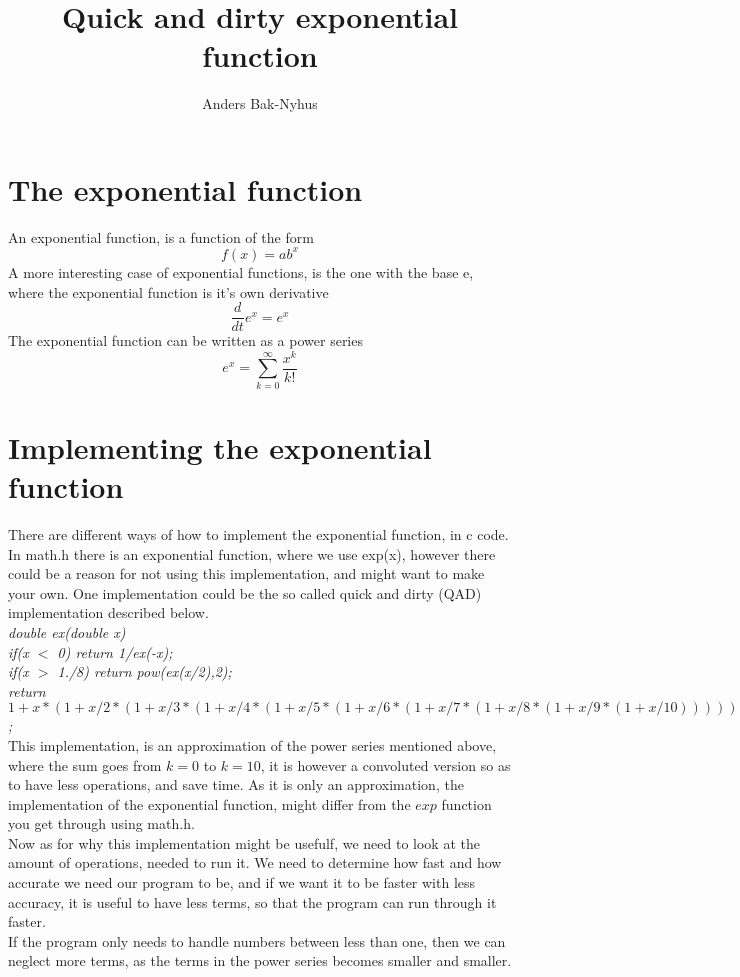 \documentclass[]{article}
\title{Quick and dirty exponential function}
\author{Anders Bak-Nyhus}
\date{}
\begin{document}
\maketitle

\section*{The exponential function}
An exponential function, is a function of the form
\begin{equation}
	f(x) = ab^x
\end{equation}
A more interesting case of exponential functions, is the one with the base e, where the exponential function is it's own derivative
\begin{equation}
	\frac{d}{dt}e^x = e^x
\end{equation}
The exponential function can be written as a power series
\begin{equation}
	e^x = \sum_{k=0}^{\infty} \frac{x^k}{k!}
\end{equation}
\section*{Implementing the exponential function}
There are different ways of how to implement the exponential function, in c code. 
In math.h there is an exponential function, where we use exp(x), however there could be a reason for not using this implementation, and might want to make your own.
One implementation could be the so called quick and dirty (QAD) implementation described below.
\\
\textit{double ex(double x){\\
	if(x $<$ 0) return 1/ex(-x);\\
	if(x $>$ 1./8) return pow(ex(x/2),2);\\
	return $1+x*(1+x/2*(1+x/3*(1+x/4*(1+x/5*(1+x/6*(1+x/7*(1+x/8*(1+x/9*(1+x/10)))))))))$;
}
}
\\
This implementation, is an approximation of the power series mentioned above, where the sum goes from $k=0$ to $k=10$, it is however a convoluted version so as to have less operations, and save time. As it is only an approximation, the implementation of the exponential function, might differ from the $exp$ function you get through using math.h.\\
Now as for why this implementation might be usefulf, we need to look at the amount of operations, needed to run it. We need to determine how fast and how accurate we need our program to be, and if we want it to be faster with less accuracy, it is useful to have less terms, so that the program can run through it faster.\\
If the program only needs to handle numbers between less than one, then we can neglect more terms, as the terms in the power series becomes smaller and smaller.
\\
\end{document}
